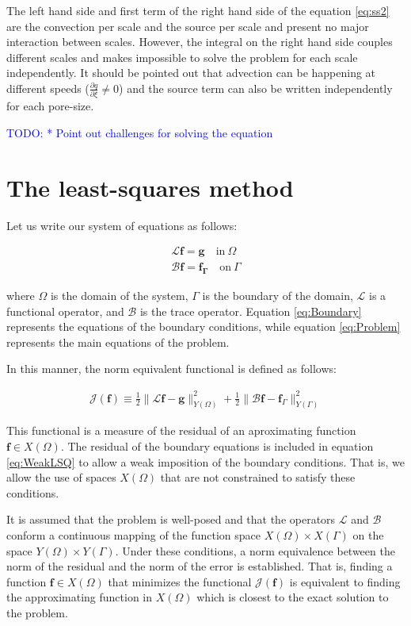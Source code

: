 \documentclass{CFD2011}
\newcommand{\TODO}[1]{\textcolor{blue}{TODO: #1} \\}
\begin{document}
The left hand side and first term of the right hand side of the equation \ref{eq:ss2} are the convection per scale and the source per scale and present no major interaction between scales. However, the integral on the right hand side couples different scales and makes impossible to solve the problem for each scale independently. It should be pointed out that advection can be happening at different speeds ($\tfrac{\partial q}{\partial \xi} \neq 0$) and the source term can also be written independently for each pore-size.

\TODO{    * Point out challenges for solving the equation}

\section{The least-squares method}
Let us write our system of equations as follows:

\begin{eqnarray}
\mathcal{L} \mathbf{f} = \mathbf{g} \quad \mbox{in} \ \Omega \label{eq:Problem} \\
\mathcal{B} \mathbf{f} = \mathbf{f_\Gamma} \quad \mbox{on} \ \Gamma \label{eq:Boundary}
\end{eqnarray}

\noindent where $\Omega$ is the domain of the system, $\Gamma$ is the boundary of the domain, $\mathcal{L}$ is a functional operator, and $\mathcal{B}$ is the trace operator. Equation \ref{eq:Boundary} represents the equations of the boundary conditions, while  equation \ref{eq:Problem} represents the main equations of the problem. 

In this manner, the norm equivalent functional is defined as follows:

\begin{eqnarray} 
\mathcal{J}(\mathbf{f})\equiv  \frac{1}{2}\parallel \mathcal{L} \mathbf{f} -\mathbf{g} \parallel_{Y(\Omega)}^2 + \frac{1}{2} \parallel \mathcal{B}\mathbf{f} - \mathbf{f}_{\Gamma} \parallel_{Y(\Gamma)}^2 
\label{eq:WeakLSQ}
\end{eqnarray}

This functional is a measure of the residual of an aproximating function $\mathbf{f}\in X(\Omega)$.
The residual of the boundary equations is included in equation \ref{eq:WeakLSQ} to allow a weak imposition of the boundary conditions. That is, we allow the use of spaces $X(\Omega)$ that are not constrained to satisfy these conditions.

It is assumed that the problem is well-posed and that the operators $\mathcal{L}$ and $\mathcal{B}$ conform a continuous mapping of the function space $X(\Omega)\times X(\Gamma)$ on the space $Y(\Omega) \times Y(\Gamma)$. Under these conditions, a norm equivalence between the norm of the residual and the norm of the error is established. That is, finding a function $\mathbf{f}\in X(\Omega)$ that minimizes the functional $\mathcal{J}(\mathbf{f})$ is equivalent to finding the approximating function in $X(\Omega)$ which is closest to the exact solution to the problem.
\end{document}
